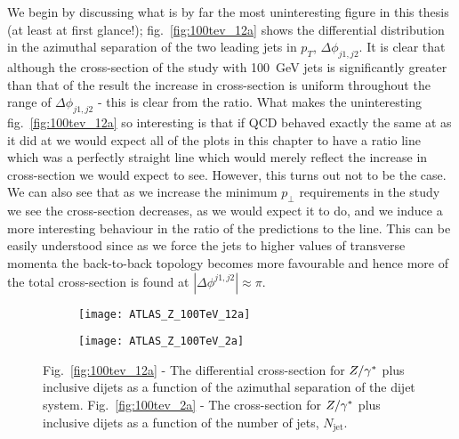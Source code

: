 	We begin by discussing what is by far the most uninteresting figure in this thesis (at least at first glance!);
	fig.~\eqref{fig:100tev_12a} shows the differential distribution in the azimuthal separation of the
	two leading jets in $p_T$, $\Delta\phi_{j1, j2}$.  It is clear that although the cross-section of the \htev
	study with 100~GeV jets is significantly greater than that of the \stev result the increase in cross-section is uniform
	throughout the range of $\Delta\phi_{j1, j2}$ - this is clear from the ratio.  What makes the uninteresting
	fig.~\eqref{fig:100tev_12a} so interesting is that if QCD behaved exactly the same at \htev as it did at \stev
	we would expect all of the plots in this chapter to have a ratio line which was a perfectly straight line
	which would merely reflect the increase in cross-section we would expect to see.  However, this turns out not to be the case.  We can also see
	that as we increase the minimum $p_\perp$ requirements in the \htev study we see the cross-section decreases, as
	we would expect it to do, and we induce a more interesting behaviour in the ratio of the predictions to the \stev line.
	This can be easily understood since as we force the jets to higher values of transverse momenta the back-to-back
	topology becomes more favourable and hence more of the total cross-section is found at $|\Delta\phi^{j1, j2}|\approx\pi$.

	\begin{figure}[bth]
		\centering
		\begin{subfigure}[b]{0.49\textwidth}
			\texttt{[image: ATLAS\_Z\_100TeV\_12a]}
			\caption{}
			\label{fig:100tev_12a}
		\end{subfigure}
		\begin{subfigure}[b]{0.49\textwidth}
			\texttt{[image: ATLAS\_Z\_100TeV\_2a]}
			\caption{}
			\label{fig:100tev_2a}
		\end{subfigure}
		\caption{Fig.~\eqref{fig:100tev_12a} - The differential cross-section for $Z/\gamma^*$ plus inclusive dijets as a
		function of the azimuthal separation of the dijet system. Fig.~\eqref{fig:100tev_2a} - The cross-section
		for $Z/\gamma^*$ plus inclusive dijets as a function of the number of jets, $N_{\text{jet}}$.}
	\end{figure}

